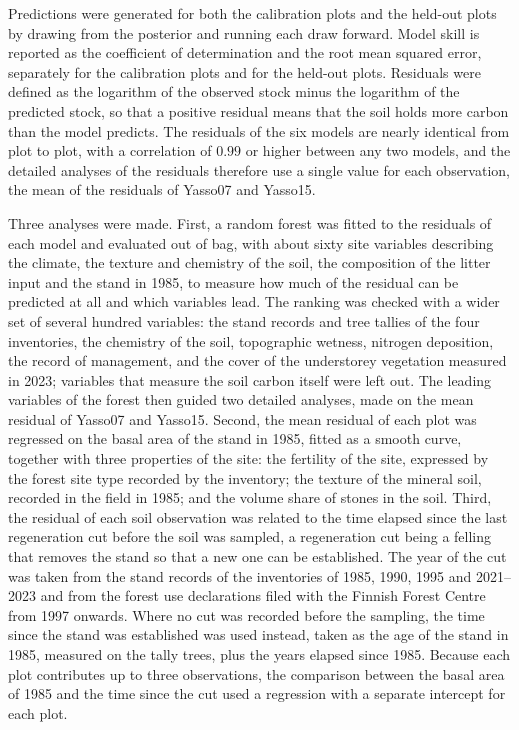 \documentclass[11pt]{article}
\begin{document}
Predictions were generated for both the calibration plots and the held-out plots by
drawing from the posterior and running each draw forward. Model skill is reported
as the coefficient of determination and the root mean squared error, separately for
the calibration plots and for the held-out plots. Residuals were defined as the
logarithm of the observed stock minus the logarithm of the predicted stock, so that a
positive residual means that the soil holds more carbon than the model predicts. The
residuals of the six models are nearly identical from plot to plot, with a correlation
of $0.99$ or higher between any two models, and the detailed analyses of the residuals
therefore use a single value for each observation, the mean of the residuals of Yasso07
and Yasso15.

Three analyses were made. First, a random forest was fitted to the residuals of each
model and evaluated out of bag, with about sixty site variables describing the climate,
the texture and chemistry of the soil, the composition of the litter input and the
stand in 1985, to measure how much of the residual can be predicted at all and which
variables lead. The ranking was checked with a wider set of several hundred variables:
the stand records and tree tallies of the four inventories, the chemistry of the soil,
topographic wetness, nitrogen deposition, the record of management, and the cover of
the understorey vegetation measured in 2023; variables that measure the soil carbon
itself were left out. The leading variables of the forest then guided two detailed
analyses, made on the mean residual of Yasso07 and Yasso15. Second, the mean residual of each
plot was regressed on the basal area of the stand in 1985, fitted as a smooth curve,
together with three properties of the site: the fertility of the site, expressed by
the forest site type recorded by the inventory; the texture of the mineral soil,
recorded in the field in 1985; and the volume share of stones in the soil. Third, the
residual of each soil observation was related to the time elapsed since the last
regeneration cut before the soil was sampled, a regeneration cut being a felling that
removes the stand so that a new one can be established. The year of the cut was taken
from the stand records of the inventories of 1985, 1990, 1995 and 2021--2023 and from
the forest use declarations filed with the Finnish Forest Centre from 1997 onwards.
Where no cut was recorded before the sampling, the time since the stand was
established was used instead, taken as the age of the stand in 1985, measured on the
tally trees, plus the years elapsed since 1985. Because each plot contributes up to
three observations, the comparison between the basal area of 1985 and the time since
the cut used a regression with a separate intercept for each plot.
\end{document}
